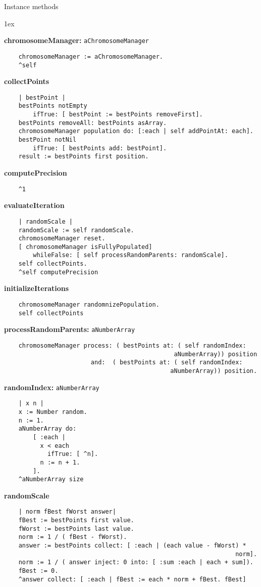 Instance methods
{\parskip 1ex\par\noindent}
{\bf chromosomeManager:} {\tt aChromosomeManager}
\begin{verbatim}
    chromosomeManager := aChromosomeManager.
    ^self

\end{verbatim}
{\bf collectPoints}
\begin{verbatim}
    | bestPoint |
    bestPoints notEmpty
        ifTrue: [ bestPoint := bestPoints removeFirst].
    bestPoints removeAll: bestPoints asArray.
    chromosomeManager population do: [:each | self addPointAt: each].
    bestPoint notNil
        ifTrue: [ bestPoints add: bestPoint].
    result := bestPoints first position.

\end{verbatim}
{\bf computePrecision}
\begin{verbatim}
    ^1

\end{verbatim}
{\bf evaluateIteration}
\begin{verbatim}
    | randomScale |
    randomScale := self randomScale.
    chromosomeManager reset.
    [ chromosomeManager isFullyPopulated]
        whileFalse: [ self processRandomParents: randomScale].
    self collectPoints.
    ^self computePrecision

\end{verbatim}
{\bf initializeIterations}
\begin{verbatim}
    chromosomeManager randomnizePopulation.
    self collectPoints

\end{verbatim}
{\bf processRandomParents:} {\tt aNumberArray}
\begin{verbatim}
    chromosomeManager process: ( bestPoints at: ( self randomIndex: 
                                               aNumberArray)) position
                        and:  ( bestPoints at: ( self randomIndex: 
                                              aNumberArray)) position.

\end{verbatim}
{\bf randomIndex:} {\tt aNumberArray}
\begin{verbatim}
    | x n |
    x := Number random.
    n := 1.
    aNumberArray do: 
        [ :each |
          x < each
            ifTrue: [ ^n].
          n := n + 1.
        ].
    ^aNumberArray size  

\end{verbatim}
{\bf randomScale}
\begin{verbatim}
    | norm fBest fWorst answer|
    fBest := bestPoints first value.
    fWorst := bestPoints last value.
    norm := 1 / ( fBest - fWorst).
    answer := bestPoints collect: [ :each | (each value - fWorst) * 
                                                                norm].
    norm := 1 / ( answer inject: 0 into: [ :sum :each | each + sum]).
    fBest := 0.
    ^answer collect: [ :each | fBest := each * norm + fBest. fBest]

\end{verbatim}

